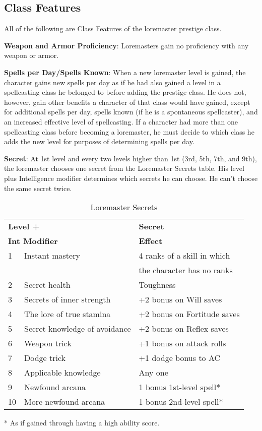 \subsection{Class Features}

				
All of the following are Class Features of the loremaster prestige class.
				
\textbf{Weapon and Armor Proficiency}: Loremasters gain no proficiency with any weapon or armor.
				
\textbf{Spells per Day/Spells Known}: When a new loremaster level is gained, the character gains new spells per day as if he had also gained a level in a spellcasting class he belonged to before adding the prestige class. He does not, however, gain other benefits a character of that class would have gained, except for additional spells per day, spells known (if he is a spontaneous spellcaster), and an increased effective level of spellcasting. If a character had more than one spellcasting class before becoming a loremaster, he must decide to which class he adds the new level for purposes of determining spells per day.
				
\textbf{Secret}: At 1st level and every two levels higher than 1st (3rd, 5th, 7th, and 9th), the loremaster chooses one secret from the Loremaster Secrets table. His level plus Intelligence modifier determines which secrets he can choose. He can't choose the same secret twice.
		
\begin{table}[]
\sffamily
\setlength{\tabcolsep}{1pt}
\caption{Loremaster Secrets}
\begin{tabular}{lll}
\multicolumn{2}{l}{\textbf{Level + }}     & \textbf{Secret} \\
\multicolumn{2}{l}{\textbf{Int Modifier}} & \textbf{Effect}\\
1 & Instant mastery & 4 ranks of a skill in which \\
  &                 & the character has no ranks\\
2 & Secret health & Toughness\\
3 & Secrets of inner strength & +2 bonus on Will saves\\
4 & The lore of true stamina & +2 bonus on Fortitude saves\\
5 & Secret knowledge of avoidance & +2 bonus on Reflex saves\\
6 & Weapon trick & +1 bonus on attack rolls\\
7 & Dodge trick & +1 dodge bonus to AC\\
8 & Applicable knowledge & Any one \\
9 & Newfound arcana & 1 bonus 1st-level spell*\\
10 & More newfound arcana & 1 bonus 2nd-level spell*\\
\end{tabular}
* As if gained through having a high ability score.\\
\end{table}

